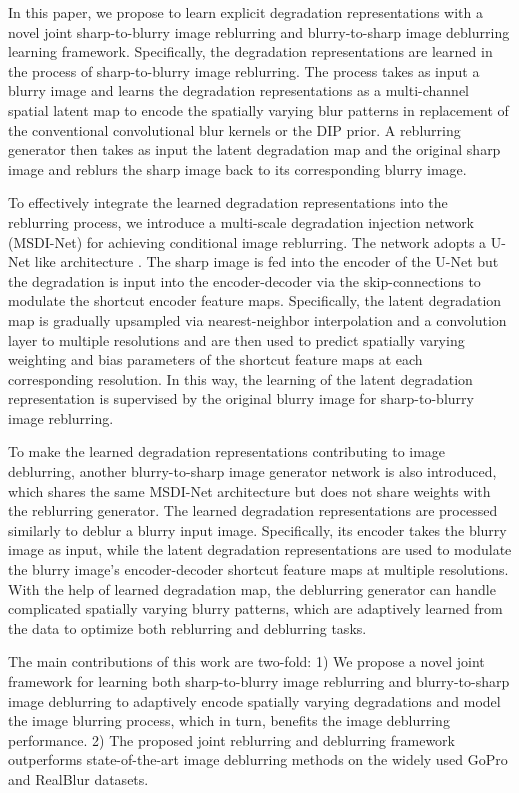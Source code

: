 \documentclass[runningheads]{llncs}
\begin{document}
In this paper, we propose to learn explicit degradation representations with a novel joint sharp-to-blurry image reblurring and blurry-to-sharp image deblurring learning framework. 
Specifically, the degradation representations are learned in the process of sharp-to-blurry image reblurring. The process takes as input a blurry image and learns the degradation representations as a multi-channel spatial latent map to encode the spatially varying blur patterns in replacement of the conventional convolutional blur kernels or the DIP prior. 
A reblurring generator then takes as input the latent degradation map and the original sharp image and reblurs the sharp image back to its corresponding blurry image.

To effectively integrate the learned degradation representations into the reblurring process, we introduce a multi-scale degradation injection network (MSDI-Net) for achieving conditional image reblurring. 
The network adopts a U-Net like architecture \cite{U-Net}. The sharp image is fed into the encoder of the U-Net but the
degradation is input into the encoder-decoder via the skip-connections to modulate the shortcut encoder feature maps. Specifically, the latent degradation map
is gradually upsampled via nearest-neighbor interpolation and a convolution layer to multiple resolutions and are then used to predict spatially varying weighting and bias parameters of the shortcut feature maps at each corresponding resolution.
In this way, the learning of the latent degradation representation is supervised by the original blurry image for sharp-to-blurry image reblurring.




To make the learned degradation representations contributing to image deblurring, another blurry-to-sharp image generator network is also introduced, which shares the same MSDI-Net architecture but does not share weights with the reblurring generator. The learned degradation representations are processed similarly to deblur a blurry input image. 
Specifically, its encoder takes the blurry image as input, while the latent degradation representations are used to modulate the blurry image's encoder-decoder shortcut feature maps at multiple resolutions. 
With the help of learned degradation map, the deblurring generator can handle complicated spatially varying blurry patterns, which are adaptively learned from the data to optimize both reblurring and deblurring tasks. 

The main contributions of this work are two-fold:
1) We propose a novel joint framework for learning both sharp-to-blurry image reblurring and blurry-to-sharp image deblurring to adaptively encode spatially varying degradations and model the image blurring process, which in turn, benefits the image deblurring performance. 
2) The proposed joint reblurring and deblurring framework outperforms state-of-the-art image deblurring methods on the widely used GoPro \cite{deblur-multi-scale} and RealBlur \cite{realblur} datasets.
\end{document}
